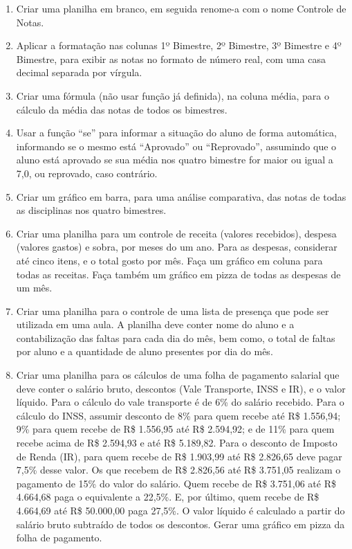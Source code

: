 \documentclass[11pt]{article}
\begin{document}
	\begin{enumerate}
		\item Criar uma planilha em branco, em seguida renome-a com o nome Controle de Notas.
		\item Aplicar a formatação nas colunas 1º Bimestre, 2º Bimestre, 3º Bimestre e 4º Bimestre, para exibir as notas no formato de número real, com uma casa decimal separada por vírgula.
		\item Criar uma fórmula (não usar função já definida), na coluna média, para o cálculo da média das notas de todos os bimestres.
		\item Usar a função “se” para informar a situação do aluno de forma automática, informando se o mesmo está “Aprovado” ou “Reprovado”, assumindo que o aluno está aprovado se sua média nos quatro bimestre for maior ou igual a 7,0, ou reprovado, caso contrário.
		\item Criar um gráfico em barra, para uma análise comparativa, das notas de todas as disciplinas nos quatro bimestres.
		\item Criar uma planilha para um controle de receita (valores recebidos), despesa (valores gastos) e sobra, por meses do um ano. Para as despesas, considerar até cinco itens, e o total gosto por mês. Fa\c ca um gráfico em coluna para todas as receitas. Fa\c ca também um gráfico em pizza de todas as despesas de um mês.
		\item Criar uma planilha para o controle de uma lista de presen\c ca que pode ser utilizada em uma aula. A planilha deve conter nome do aluno e a contabiliza\c cão das faltas para cada dia do mês, bem como, o total de faltas por aluno e a quantidade de aluno presentes por dia do mês.
		\item Criar uma planilha para os cálculos de uma folha de pagamento salarial que deve conter o salário bruto, descontos (Vale Transporte, INSS e IR), e o valor líquido. Para o cálculo do vale transporte é de 6\% do salário recebido. Para o cálculo do INSS, assumir desconto de 8\% para quem recebe até R\$ 1.556,94; 9\% para quem recebe de R\$ 1.556,95 até R\$ 2.594,92; e de 11\% para quem recebe acima de R\$ 2.594,93 e até R\$ 5.189,82. Para o desconto de Imposto de Renda (IR), para quem recebe de R\$ 1.903,99 até R\$ 2.826,65 deve pagar 7,5\% desse valor. Os que recebem de R\$ 2.826,56 até R\$ 3.751,05 realizam o pagamento de 15\% do valor do salário. Quem recebe de R\$ 3.751,06 até R\$ 4.664,68 paga o equivalente a 22,5\%. E, por último, quem recebe de R\$ 4.664,69 até R\$ 50.000,00 paga 27,5\%. O valor líquido é calculado a partir do salário bruto subtraído de todos os descontos. Gerar uma gráfico em pizza da folha de pagamento.
	\end{enumerate}
\end{document}
